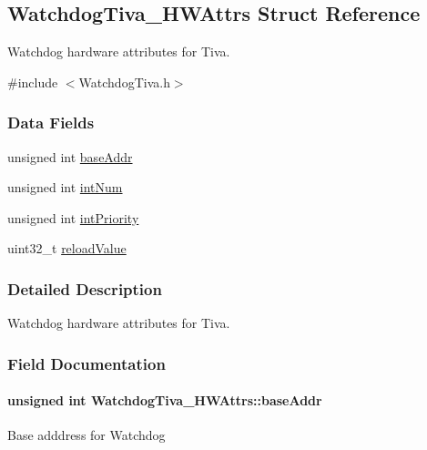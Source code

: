 \subsection{Watchdog\+Tiva\+\_\+\+H\+W\+Attrs Struct Reference}
\label{struct_watchdog_tiva___h_w_attrs}


Watchdog hardware attributes for Tiva.  




{\ttfamily \#include $<$Watchdog\+Tiva.\+h$>$}

\subsubsection*{Data Fields}
\begin{DoxyCompactItemize}
\item 
unsigned int \hyperlink{struct_watchdog_tiva___h_w_attrs_a68961f02d0b68c1a2f47d44a610d2798}{base\+Addr}
\item 
unsigned int \hyperlink{struct_watchdog_tiva___h_w_attrs_aebd70848c54717c57475a01618a68f50}{int\+Num}
\item 
unsigned int \hyperlink{struct_watchdog_tiva___h_w_attrs_ab4e8599de83ffca39b09a81dde07144d}{int\+Priority}
\item 
uint32\+\_\+t \hyperlink{struct_watchdog_tiva___h_w_attrs_a89674a9a8537a33a7e5ef4b94ac8f5e4}{reload\+Value}
\end{DoxyCompactItemize}


\subsubsection{Detailed Description}
Watchdog hardware attributes for Tiva. 

\subsubsection{Field Documentation}
\paragraph[{base\+Addr}]{\setlength{\rightskip}{0pt plus 5cm}unsigned int Watchdog\+Tiva\+\_\+\+H\+W\+Attrs\+::base\+Addr}\label{struct_watchdog_tiva___h_w_attrs_a68961f02d0b68c1a2f47d44a610d2798}
Base adddress for Watchdog 
